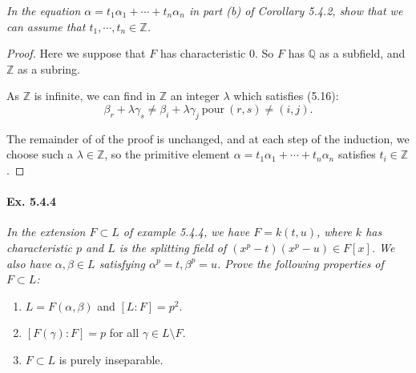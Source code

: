 \documentclass[11pt,a4paper]{article}
\newcommand{\Q}{\mathbb{Q}}
\newcommand{\Z}{\mathbb{Z}}
\begin{document}
{\it In the equation $\alpha = t_1\alpha_1+\cdots+t_n \alpha_n$ in part (b) of Corollary 5.4.2, show that we can assume that $t_1,\cdots,t_n \in \Z$.
}

\begin{proof}
Here we suppose that $F$ has characteristic 0. So $F$ has $\Q$ as a subfield, and $\Z$ as a subring.

As $\Z$ is infinite, we can find in $\Z$ an integer $\lambda$ which satisfies (5.16):
$$\beta_r + \lambda \gamma_s \neq \beta_i + \lambda \gamma_j\ \mathrm{pour}\ (r,s) \neq(i,j).$$

The remainder of of the proof is unchanged, and at each step of the induction, we choose such a  $\lambda \in \Z$, so the primitive element $\alpha = t_1\alpha_1+\cdots+t_n\alpha_n$ satisfies $t_i \in \Z$.
\end{proof}

\paragraph{Ex. 5.4.4}

{\it In the extension $F \subset L$ of example 5.4.4, we have $F=k(t,u)$, where $k$ has characteristic $p$ and $L$ is the splitting field of $(x^p-t)(x^p-u) \in F[x]$. We also have $\alpha,\beta \in L$ satisfying $\alpha^p=t, \beta^p=u$. Prove the following properties of $F \subset L$:
\begin{enumerate}
\item[(a)] $L = F(\alpha,\beta)$ and $[L:F] = p^2$.
\item[(b)] $[F(\gamma):F] = p$ for all $\gamma \in L \setminus F$.
\item[(c)] $F \subset L$ is purely inseparable.
\end{enumerate}
}
\end{document}
